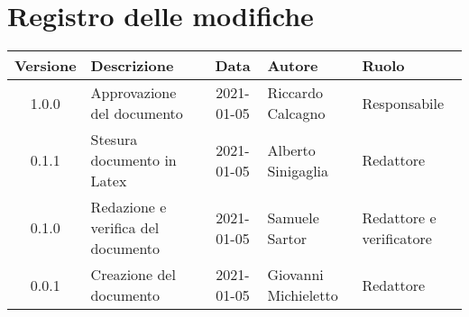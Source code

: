 \section*{Registro delle modifiche}

\begin{center}
	\begin{longtable}{|c|p{3.5cm}|c|p{3cm}|p{3cm}|}
		\hline
		\rowcolor{lighter-grayer}
		\textbf{Versione} & \textbf{Descrizione} & \textbf{Data} & \textbf{Autore} & \textbf{Ruolo} \\
		\hline
		\endfirsthead
		1.0.0 & Approvazione del documento & 2021-01-05 & Riccardo Calcagno & Responsabile \\
		\hline
		0.1.1 & Stesura documento in Latex & 2021-01-05 & Alberto Sinigaglia & Redattore \\
		\hline
		0.1.0 & Redazione e verifica del documento & 2021-01-05 & Samuele Sartor & Redattore e verificatore \\
		\hline
		0.0.1 & Creazione del documento & 2021-01-05 & Giovanni Michieletto & Redattore \\
		\hline

	\end{longtable}
\end{center}
